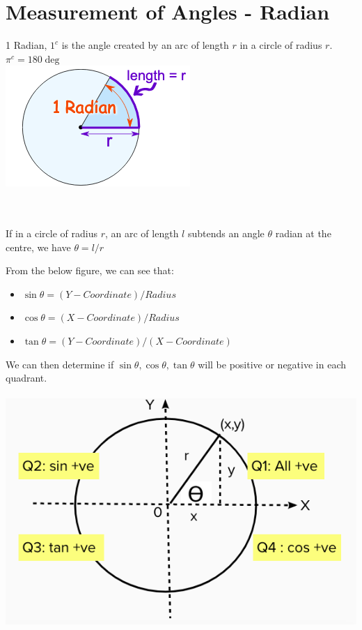 \documentclass{book}
\begin{document}
	 \section{Measurement of Angles - Radian}
	 1 Radian, $1^c$ is the angle created by an arc of length $r$ in a circle of radius $r$. \\
	 $\pi^c = 180\deg$ \\
	 
	\includegraphics[scale=0.6]{radians} \\ \\ \\
	
	\begin{mdframed}[backgroundcolor=yellow]
		If in a circle of radius $r$, an arc of length $l$ subtends an angle $\theta$ radian at the centre, we have $\theta = l/r$
	\end{mdframed}
	 
	 From the below figure, we can see that:
	 \begin{itemize}
		\item $\sin\theta = (Y-Coordinate)/Radius$
		\item $\cos\theta = (X-Coordinate)/Radius$
		\item $\tan\theta = (Y-Coordinate)/(X-Coordinate)$
	 \end{itemize}
	 We can then determine if $\sin\theta, \cos\theta, \tan\theta$ will be positive or negative in each quadrant. \\ \\
	 \includegraphics[scale=0.6]{unitcircle} \\
	 
\end{document}
